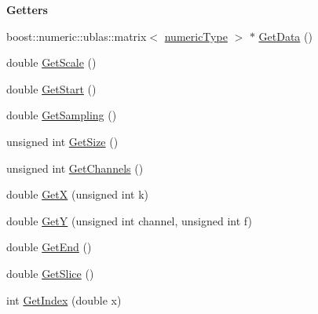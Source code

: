 \begin{Indent}\textbf{ Getters}\par
\begin{DoxyCompactItemize}
\item 
boost\+::numeric\+::ublas\+::matrix$<$ \hyperlink{classtsa_1_1_seq_view_a72b689db78d0feea3305e62cc3852a1d}{numeric\+Type} $>$ $\ast$ \hyperlink{classtsa_1_1_seq_view_a64b132f96cd89cb36600ae172a823cbc}{Get\+Data} ()
\item 
double \hyperlink{classtsa_1_1_seq_view_ae4bf641c5773f23e301602ad89ccfe4b}{Get\+Scale} ()
\item 
double \hyperlink{classtsa_1_1_seq_view_a30b6045b2c1020988221906b68760842}{Get\+Start} ()
\item 
double \hyperlink{classtsa_1_1_seq_view_a6da2cdab5d792d58c43fea2415787868}{Get\+Sampling} ()
\item 
unsigned int \hyperlink{classtsa_1_1_seq_view_ace63410a473e9865f9114583e793f19e}{Get\+Size} ()
\item 
unsigned int \hyperlink{classtsa_1_1_seq_view_aa050543264ee43fe0bf8758b4aedbaee}{Get\+Channels} ()
\item 
double \hyperlink{classtsa_1_1_seq_view_a43c18f56f11a2557fa44fbd28acec28c}{GetX} (unsigned int k)
\item 
double \hyperlink{classtsa_1_1_seq_view_a768d8f8a3ab1db372a382ca4345dd426}{GetY} (unsigned int channel, unsigned int f)
\item 
double \hyperlink{classtsa_1_1_seq_view_a533806cacf5e6cf3cff6e35a6308ea34}{Get\+End} ()
\item 
double \hyperlink{classtsa_1_1_seq_view_a4241f9e722f288455a7a3e5168b60d63}{Get\+Slice} ()
\item 
int \hyperlink{classtsa_1_1_seq_view_a4e03aa960de613cab9b59b3e726d7460}{Get\+Index} (double x)
\end{DoxyCompactItemize}
\end{Indent}
